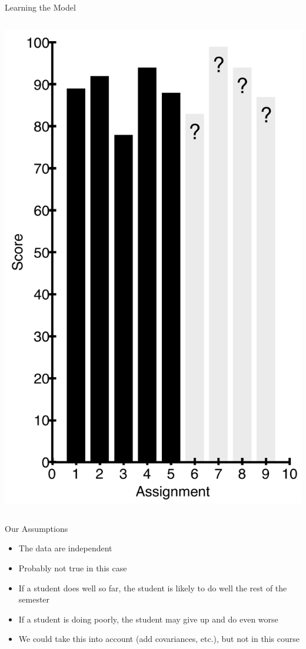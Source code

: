\documentclass[aspectratio=169]{beamer}
\begin{document}
\begin{frame}{Learning the Model}
\begin{columns}[c]
\begin{column}{0.3\textwidth}
\includegraphics[width=1\textwidth]{lectModel1/scores.pdf}
\end{column}
\end{columns}
\end{frame}
\begin{frame}{Our Assumptions}

\begin{itemize}
	\item The data are independent
	\item Probably not true in this case
	\item If a student does well so far, the student is likely to do well the rest of the semester
	\item If a student is  doing poorly, the student may give up and do even worse
	\item We could take this into account (add covariances, etc.),  but not in this course
\end{itemize}
\end{frame}
\end{document}
